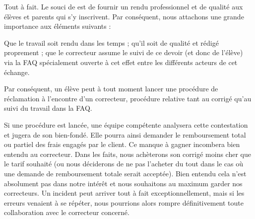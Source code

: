 ﻿Tout à fait. Le souci de \eDevoir est de fournir un rendu professionnel et de qualité aux élèves et parents qui s'y inscrivent. Par conséquent, nous attachons une grande importance aux éléments suivants :
\begin{itemize}
	\li Que le travail soit rendu dans les temps ;
	\li qu'il soit de qualité et rédigé proprement ;
	\li que le correcteur assume le suivi de ce devoir (et donc de l'élève) via la FAQ spécialement ouverte à cet effet entre les différents acteurs de cet échange.
\end{itemize}

Par conséquent, un élève peut à tout moment lancer une procédure de réclamation à l'encontre d'un correcteur, procédure relative tant au corrigé qu'au suivi du travail dans la FAQ.

Si une procédure est lancée, une équipe compétente analysera cette contestation et jugera de son bien-fondé. Elle pourra ainsi demander le remboursement total ou partiel des frais engagés par le client. Ce manque à gagner incombera bien entendu au correcteur. Dans les faits, nous achèterons son corrigé moins cher que le tarif souhaité (ou nous déciderons de ne pas l'acheter du tout dans le cas où une demande de remboursement totale serait acceptée). Bien entendu cela n'est absolument pas dans notre intérêt et nous souhaitons au maximum garder nos correcteurs. Un incident peut arriver tout à fait exceptionnellement, mais si les erreurs venaient à se répéter, nous pourrions alors rompre définitivement toute collaboration avec le correcteur concerné.